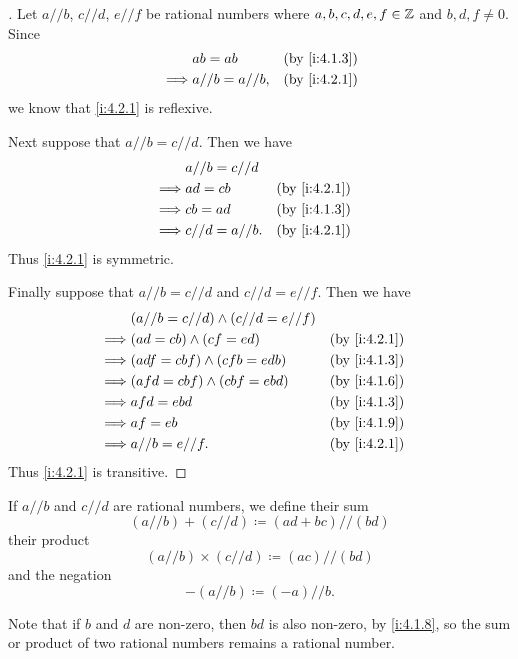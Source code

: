 \begin{proof}[]
  Let \(a // b\), \(c // d\), \(e // f\) be rational numbers where \(a, b, c, d, e, f \in \mathbb{Z}\) and \(b, d, f \neq 0\).
  Since
  \begin{align*}
             & ab = ab          &  & \by{i:4.1.3} \\
    \implies & a // b = a // b, &  & \by{i:4.2.1}
  \end{align*}
  we know that \cref{i:4.2.1} is reflexive.

  Next suppose that \(a // b = c // d\).
  Then we have
  \begin{align*}
             & a // b = c // d                    \\
    \implies & ad = cb          &  & \by{i:4.2.1} \\
    \implies & cb = ad          &  & \by{i:4.1.3} \\
    \implies & c // d = a // b. &  & \by{i:4.2.1}
  \end{align*}
  Thus \cref{i:4.2.1} is symmetric.

  Finally suppose that \(a // b = c // d\) and \(c // d = e // f\).
  Then we have
  \begin{align*}
             & (a // b = c // d) \land (c // d = e // f)                   \\
    \implies & (ad = cb) \land (cf = ed)                 &  & \by{i:4.2.1} \\
    \implies & (adf = cbf) \land (cfb = edb)             &  & \by{i:4.1.3} \\
    \implies & (afd = cbf) \land (cbf = ebd)             &  & \by{i:4.1.6} \\
    \implies & afd = ebd                                 &  & \by{i:4.1.3} \\
    \implies & af = eb                                   &  & \by{i:4.1.9} \\
    \implies & a // b = e // f.                          &  & \by{i:4.2.1}
  \end{align*}
  Thus \cref{i:4.2.1} is transitive.
\end{proof}

\begin{defn}\label{i:4.2.2}
  If \(a // b\) and \(c // d\) are rational numbers, we define their sum
  \[
    (a // b) + (c // d) \coloneqq (ad + bc) // (bd)
  \]
  their product
  \[
    (a // b) \times (c // d) \coloneqq (ac) // (bd)
  \]
  and the negation
  \[
    -(a // b) \coloneqq (-a) // b.
  \]

  Note that if \(b\) and \(d\) are non-zero, then \(bd\) is also non-zero, by \cref{i:4.1.8}, so the sum or product of two rational numbers remains a rational number.
\end{defn}

